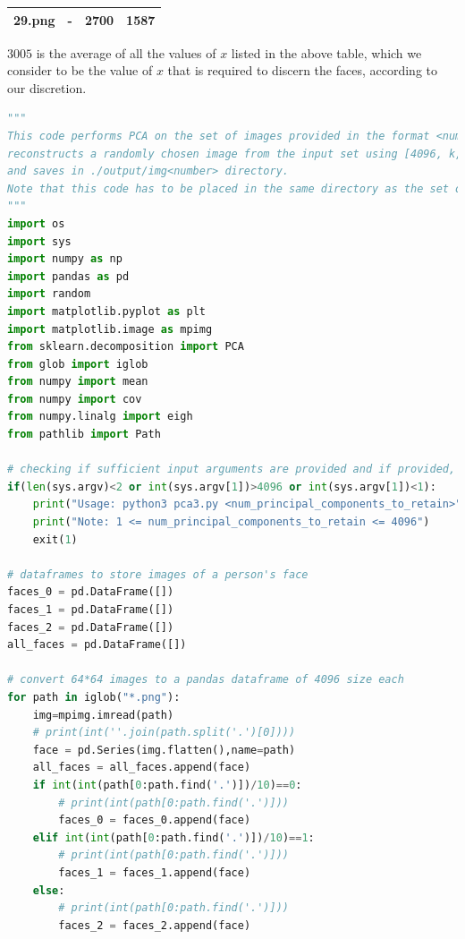 \documentclass{article}
\begin{document}
\begin{flushleft}
\begin{table}[h!]
\begin{tabular}{ | c | c | c | c |}
                29.png & - & 2700 & 1587 \\ \hline
            \end{tabular}
        \end{table}
        $3005$ is the average of all the values of $x$ listed in the above table, which we consider to be the value of $x$ that is required to discern the faces, according to our discretion.  
        \clearpage
        \begin{lstlisting}[language=Python, title={Python code to perform PCA on images}]
"""
This code performs PCA on the set of images provided in the format <number>.png,
reconstructs a randomly chosen image from the input set using [4096, k, <k] Principal Components,
and saves in ./output/img<number> directory.
Note that this code has to be placed in the same directory as the set of input images (or else change the path in the code accordingly)
"""
import os
import sys
import numpy as np
import pandas as pd
import random
import matplotlib.pyplot as plt
import matplotlib.image as mpimg
from sklearn.decomposition import PCA
from glob import iglob
from numpy import mean
from numpy import cov
from numpy.linalg import eigh
from pathlib import Path

# checking if sufficient input arguments are provided and if provided, are correct or not
if(len(sys.argv)<2 or int(sys.argv[1])>4096 or int(sys.argv[1])<1):
    print("Usage: python3 pca3.py <num_principal_components_to_retain>")
    print("Note: 1 <= num_principal_components_to_retain <= 4096")
    exit(1)

# dataframes to store images of a person's face
faces_0 = pd.DataFrame([])
faces_1 = pd.DataFrame([])
faces_2 = pd.DataFrame([])
all_faces = pd.DataFrame([])

# convert 64*64 images to a pandas dataframe of 4096 size each
for path in iglob("*.png"):
    img=mpimg.imread(path)
    # print(int(''.join(path.split('.')[0])))
    face = pd.Series(img.flatten(),name=path)
    all_faces = all_faces.append(face)
    if int(int(path[0:path.find('.')])/10)==0:
        # print(int(path[0:path.find('.')]))
        faces_0 = faces_0.append(face)
    elif int(int(path[0:path.find('.')])/10)==1:
        # print(int(path[0:path.find('.')]))
        faces_1 = faces_1.append(face)
    else:
        # print(int(path[0:path.find('.')]))
        faces_2 = faces_2.append(face)


\end{lstlisting}
\end{flushleft}
\end{document}
